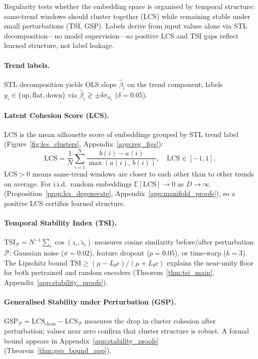 \documentclass[10pt]{article}
\theoremstyle{definition}
\theoremstyle{remark}
\newcommand{\E}{\mathbb{E}}
\newcommand{\lcs}{\ensuremath{\mathrm{LCS}}}
\newcommand{\tsi}{\ensuremath{\mathrm{TSI}}}
\newcommand{\gsp}{\ensuremath{\mathrm{GSP}}}
\begin{document}
Regularity tests whether the embedding space is organised by temporal
structure: same-trend windows should cluster together (LCS) while remaining
stable under small perturbations (TSI, GSP).
Labels derive from input values alone via STL decomposition---no model
supervision---so positive LCS and TSI gaps reflect learned structure, not
label leakage.

\paragraph{Trend labels.}
STL decomposition \citep{cleveland1990stl} yields OLS slope $\hat{\beta}_i$
on the trend component; labels $y_i \in \{\text{up},\text{flat},\text{down}\}$
via $\hat{\beta}_i \gtrless \pm\delta\sigma_{w_i}$ ($\delta{=}0.05$).

\paragraph{Latent Cohesion Score (LCS).}
LCS is the mean silhouette score of embeddings grouped by STL trend label
(Figure~\ref{fig:lcs_clusters}, Appendix~\ref{app:reg_figs}):
\[
  \lcs = \frac{1}{N}\sum_{i=1}^N \frac{b(i) - a(i)}{\max(a(i),\,b(i))},
  \quad \lcs \in [-1,1].
\]
$\lcs{>}0$ means same-trend windows are closer to each other than to other
trends on average.
For i.i.d.\ random embeddings $\E[\lcs] \to 0$ as $D \to \infty$
(Proposition~\ref{prop:lcs_degenerate}, Appendix~\ref{app:manifold_proofs}),
so a positive LCS certifies learned structure.

\paragraph{Temporal Stability Index (TSI).}
$\tsi_{\mathcal{P}} = N^{-1}\sum_i \cos(z_i, \tilde{z}_i)$ measures cosine
similarity before/after perturbation $\mathcal{P}$: Gaussian noise ($\sigma{=}0.02$),
feature dropout ($p{=}0.05$), or time-warp ($k{=}3$).
The Lipschitz bound
$\tsi \geq (\mu - L_\theta\epsilon)/(\mu + L_\theta\epsilon)$\label{thm:tsi_main}
explains the near-unity floor for both pretrained and random encoders
(Theorem~\ref{thm:tsi_main}, Appendix~\ref{app:stability_proofs}).

\paragraph{Generalised Stability under Perturbation (GSP).}
$\gsp_{\mathcal{P}} = \lcs_{\mathrm{clean}} - \lcs_{\mathcal{P}}$ measures
the drop in cluster cohesion after perturbation; values near zero confirm that
cluster structure is robust.
A formal bound appears in Appendix~\ref{app:stability_proofs}
(Theorem~\ref{thm:gsp_bound_app}).
\end{document}
